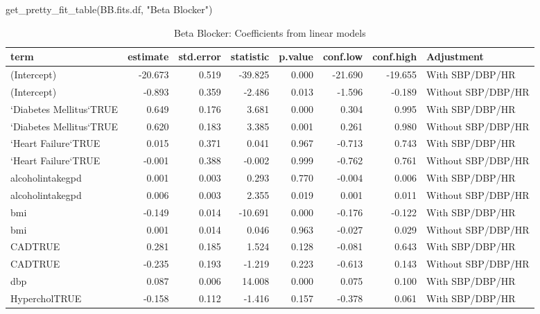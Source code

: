 \documentclass[
]{article}
\newenvironment{Shaded}{\begin{snugshade}}{\end{snugshade}}
\newcommand{\FunctionTok}[1]{\textcolor[rgb]{0.00,0.00,0.00}{#1}}
\newcommand{\NormalTok}[1]{#1}
\newcommand{\StringTok}[1]{\textcolor[rgb]{0.31,0.60,0.02}{#1}}
\begin{document}
\begin{Shaded}
\begin{Highlighting}[]
\FunctionTok{get\_pretty\_fit\_table}\NormalTok{(BB.fits.df, }\StringTok{"Beta Blocker"}\NormalTok{)}
\end{Highlighting}
\end{Shaded}

\begin{table}

\caption{\label{tab:BB-fit-table}Beta Blocker: Coefficients from linear models}
\centering
\begin{tabular}[t]{l|r|r|r|r|r|r|l}
\hline
term & estimate & std.error & statistic & p.value & conf.low & conf.high & Adjustment\\
\hline
(Intercept) & -20.673 & 0.519 & -39.825 & 0.000 & -21.690 & -19.655 & With SBP/DBP/HR\\
\hline
(Intercept) & -0.893 & 0.359 & -2.486 & 0.013 & -1.596 & -0.189 & Without SBP/DBP/HR\\
\hline
`Diabetes Mellitus`TRUE & 0.649 & 0.176 & 3.681 & 0.000 & 0.304 & 0.995 & With SBP/DBP/HR\\
\hline
`Diabetes Mellitus`TRUE & 0.620 & 0.183 & 3.385 & 0.001 & 0.261 & 0.980 & Without SBP/DBP/HR\\
\hline
`Heart Failure`TRUE & 0.015 & 0.371 & 0.041 & 0.967 & -0.713 & 0.743 & With SBP/DBP/HR\\
\hline
`Heart Failure`TRUE & -0.001 & 0.388 & -0.002 & 0.999 & -0.762 & 0.761 & Without SBP/DBP/HR\\
\hline
alcoholintakegpd & 0.001 & 0.003 & 0.293 & 0.770 & -0.004 & 0.006 & With SBP/DBP/HR\\
\hline
alcoholintakegpd & 0.006 & 0.003 & 2.355 & 0.019 & 0.001 & 0.011 & Without SBP/DBP/HR\\
\hline
bmi & -0.149 & 0.014 & -10.691 & 0.000 & -0.176 & -0.122 & With SBP/DBP/HR\\
\hline
bmi & 0.001 & 0.014 & 0.046 & 0.963 & -0.027 & 0.029 & Without SBP/DBP/HR\\
\hline
CADTRUE & 0.281 & 0.185 & 1.524 & 0.128 & -0.081 & 0.643 & With SBP/DBP/HR\\
\hline
CADTRUE & -0.235 & 0.193 & -1.219 & 0.223 & -0.613 & 0.143 & Without SBP/DBP/HR\\
\hline
dbp & 0.087 & 0.006 & 14.008 & 0.000 & 0.075 & 0.100 & With SBP/DBP/HR\\
\hline
HypercholTRUE & -0.158 & 0.112 & -1.416 & 0.157 & -0.378 & 0.061 & With SBP/DBP/HR\\

\end{tabular}
\end{table}
\end{document}
